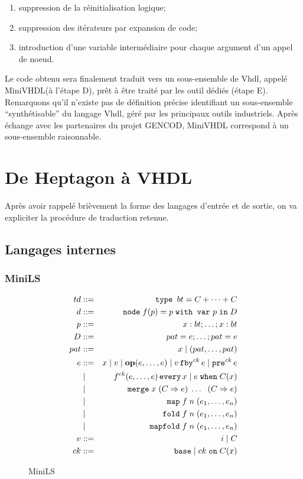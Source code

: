 \documentclass[a4paper]{article}
\newcommand{\LANG}{{\sc Heptagon}}
\newcommand{\minils}{{\sc MiniLS}}
\newcommand{\minivhdl}{{\sc MiniVHDL}}
\newcommand{\vhdl}{{\sc Vhdl}}
\newcommand{\p}[0]{\; \vert \;}
\newcommand{\mybox}[1]{\mbox{\tt{#1}}}
\newcommand{\Coloneqq}[0]{::=}
\newcommand{\Node}[4]{\mybox{node} \; f(#1) = #2 \; \mybox{with var} \
  #3 \; \mybox{in} \; #4}
\newcommand{\Op}[2]{\mybox{\bf{op}}(#1,\dots,#2)}
\newcommand{\Fby}[2]{#1 \, \mybox{fby}^{ck} \, #2}
\newcommand{\Pre}[1]{\mybox{pre}^{ck} \, #1}
\newcommand{\Every}[4]{#1^{ck}(#2,\dots,#3) \, \mybox{every} \, #4}
\newcommand{\When}[3]{#1 \; \mybox{when} \; #2(#3)}
\newcommand{\Merge}[5]{\mybox{merge} \; #1 \; (#2 \Rightarrow #3) \; \dots \; \
  (#4 \Rightarrow #5)}
\newcommand{\Base}[0]{\mybox{base}}
\newcommand{\On}[3]{#1 \; \mybox{on} \; #2 (#3)}
\newcommand{\Map}[3]{\mathtt{map} \; #1\; n\; (#2,\dots,#3)}
\newcommand{\Fold}[3]{\mathtt{fold} \; #1\; n\; (#2,\dots,#3)}
\newcommand{\Mapfold}[3]{\mathtt{mapfold} \; #1\; n\; (#2,\dots,#3)}
\begin{document}
\renewcommand{\labelenumi}{\Alph{enumi}}
\begin{enumerate}
\item suppression de la réinitialisation logique;
\item suppression des itérateurs par expansion de code;
\item introduction d'une variable intermédiaire pour chaque argument d'un appel
  de noeud.
\end{enumerate}
\renewcommand{\labelenumi}{\arabic{enumi}}

Le code obtenu sera finalement traduit vers un sous-ensemble de \vhdl, appelé
\minivhdl (à l'étape D), prêt à être traité par les outil dédiés (étape
E). Remarquons qu'il n'existe pas de définition précise identifiant un
sous-ensemble ``synthétisable'' du langage \vhdl, géré par les principaux outils
industriels. Après échange avec les partenaires du projet GENCOD, \minivhdl{}
correspond à un sous-ensemble raisonnable.


\section{De \LANG{} à VHDL}
Après avoir rappelé brièvement la forme des langages d'entrée et de sortie, on
va expliciter la procédure de traduction retenue.

\subsection{Langages internes}

\subsubsection{MiniLS}
\label{sec:syn:mls}

\begin{figure}[h]
  \centering
  \begin{eqnarray*}
    td & \Coloneqq & \mybox{type } bt = C + \dots + C \\
    d & \Coloneqq & \Node{p}{p}{p}{D} \\
    p & \Coloneqq & x : bt; \dots; x : bt \\
    D & \Coloneqq & pat = e; \dots; pat = e \\
    pat & \Coloneqq & x \p (pat,\dots,pat) \\
    e & \Coloneqq & x \p v \p \Op{e}{e} \p \Fby{v}{e} \p \Pre{e} \\
    & \p & \Every{f}{e}{e}{x} \p \When{e}{C}{x} \\
    & \p & \Merge{x}{C}{e}{C}{e} \\
    & \p & \Map{f}{e_1}{e_n} \\
    & \p & \Fold{f}{e_1}{e_n} \\
    & \p & \Mapfold{f}{e_1}{e_n} \\
    v & \Coloneqq & i \p C \\
    ck & \Coloneqq & \Base \p \On{ck}{C}{x}
  \end{eqnarray*}
  \caption{\minils}
  \label{fig:mls}
\end{figure}
\end{document}
